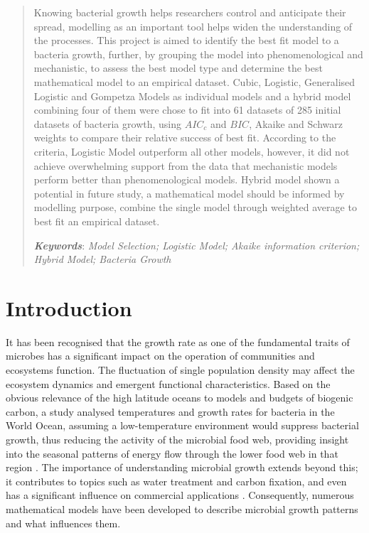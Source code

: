 \documentclass[a4paper]{report}
\begin{document}
\begin{linenumbers}
\renewcommand\thesection{\arabic{section}}
\newcommand{\keywords}[1]{\par\addvspace\baselineskip
\noindent\keywordname\enspace\ignorespaces#1}
\begin{abstract}
Knowing bacterial growth helps researchers control and anticipate their spread, modelling as an important tool helps widen the understanding of the processes. This project is aimed to identify the best fit model to a bacteria growth, further, by grouping the model into phenomenological and mechanistic, to assess the best model type and determine the best mathematical model to an empirical dataset. Cubic, Logistic, Generalised Logistic and Gompetza Models as individual models and a hybrid model combining four of them were chose to fit into 61 datasets of 285 initial datasets of bacteria growth, using $AIC_c$ and $BIC$, Akaike and Schwarz weights to compare their relative success of best fit. According to the criteria, Logistic Model outperform all other models, however, it did not achieve overwhelming support from the data that mechanistic models perform better than phenomenological models. Hybrid model shown a potential in future study, a mathematical model should be informed by modelling purpose, combine the single model through weighted average to best fit an empirical dataset. 

\textbf{\textit{Keywords}}: \textit{Model Selection; Logistic Model; Akaike information criterion; Hybrid Model; Bacteria Growth}

\end{abstract}

    \section{Introduction}
    It has been recognised that the growth rate as one of the fundamental traits of microbes has a significant impact on the operation of communities and ecosystems function. The fluctuation of single population density may affect the ecosystem dynamics and emergent functional characteristics. Based on the obvious relevance of the high latitude oceans to models and budgets of biogenic carbon, a study analysed temperatures and growth rates for bacteria in the World Ocean, assuming a low-temperature environment would suppress bacterial growth, thus reducing the activity of the microbial food web, providing insight into the seasonal patterns of energy flow through the lower food web in that region \citep{rivkin1996microbial}. The importance of understanding microbial growth extends beyond this; it contributes to topics such as water treatment and carbon fixation, and even has a significant influence on commercial applications \citep{esser2015modeling}. Consequently, numerous mathematical models have been developed to describe microbial growth patterns and what influences them.


\end{linenumbers}
\end{document}
